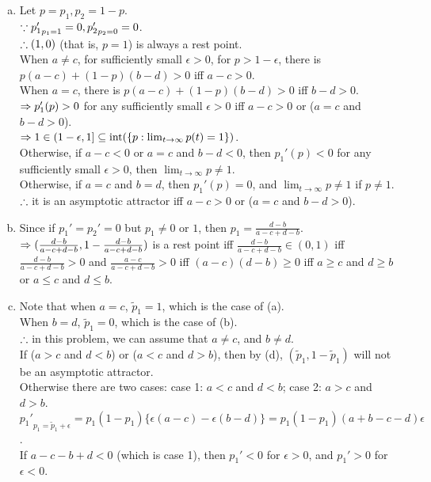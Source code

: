 \begin{pr}[9.8.12]$ $
\begin{enumerate}[(a)]
\item Let $p=p_1, p_2=1-p$.\\
$\because{p_1'}_{p_1=1}=0, {p_2'}_{p_2=0}=0$.\\
$\therefore(1, 0)$ (that is, $p=1$) is always a rest point.\\
When $a\neq c$, for sufficiently small $\epsilon>0$, for $p>1-\epsilon$, there is $p(a-c)+(1-p)(b-d)>0$ iff $a-c>0$.\\
When $a=c$, there is $p(a-c)+(1-p)(b-d)>0$ iff $b-d>0$.\\
$\Rightarrow p_1'(p)>0$ for any sufficiently small $\epsilon>0$ iff $a-c>0$ or ($a=c$ and $b-d>0$).\\
$\Rightarrow1\in(1-\epsilon, 1]\subseteq\mathrm{int}(\{p:\lim_{t\to\infty}p(t)=1\})$.\\
Otherwise, if $a-c<0$ or $a=c$ and $b-d<0$, then $p_1'(p)<0$ for any sufficiently small $\epsilon>0$, then $\lim_{t\to\infty}p\neq1$.\\
Otherwise, if $a=c$ and $b=d$, then $p_1'(p)=0$, and $\lim_{t\to\infty}p\neq1$ if $p\neq1$.\\
$\therefore$ it is an asymptotic attractor iff $a-c>0$ or ($a=c$ and $b-d>0$).
\setcounter{enumi}{3}
\item Since if $p_1'=p_2'=0$ but $p_1\neq0$ or $1$, then $p_1=\frac{d-b}{a-c+d-b}$.\\
$\Rightarrow(\frac{d-b}{a-c+d-b}, 1-\frac{d-b}{a-c+d-b})$ is a rest point iff $\frac{d-b}{a-c+d-b}\in(0, 1)$ iff $\frac{d-b}{a-c+d-b}>0$ and $\frac{a-c}{a-c+d-b}>0$ iff $(a-c)(d-b)\geq0$ iff $a\geq c$ and $d\geq b$ or $a\leq c$ and $d\leq b$.
\item Note that when $a=c$, $\tilde p_1=1$, which is the case of (a).\\
When $b=d$, $\tilde p_1=0$, which is the case of (b).\\
$\therefore$ in this problem, we can assume that $a\neq c$, and $b\neq d$.\\
If ($a>c$ and $d<b$) or ($a<c$ and $d>b$), then by (d), $(\tilde p_1, 1-\tilde p_1)$ will not be an asymptotic attractor.\\
Otherwise there are two cases: case 1: $a<c$ and $d<b$; case 2: $a>c$ and $d>b$.\\
${p_1'}_{p_1=\tilde p_1+\epsilon}=p_1(1-p_1)\{\epsilon(a-c)-\epsilon(b-d)\}=p_1(1-p_1)(a+b-c-d)\epsilon$.\\
If $a-c-b+d<0$ (which is case 1), then $p_1'<0$ for $\epsilon>0$, and $p_1'>0$ for $\epsilon<0$.\\

\end{enumerate}
\end{pr}
